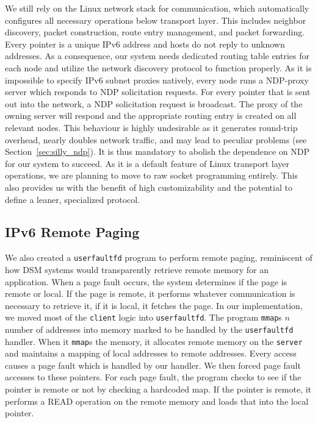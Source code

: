 We still rely on the Linux network stack for communication, which automatically configures all necessary operations below transport layer. This includes neighbor discovery, packet construction, route entry management, and packet forwarding.
Every pointer is a unique IPv6 address and hosts do not reply to unknown addresses. As a consequence, our system needs dedicated routing table entries for each node and utilize the network discovery protocol to function properly.
As it is impossible to specify IPv6 subnet proxies natively, every node runs a NDP-proxy server which responds to NDP solicitation requests. For every pointer that is sent out into the network, a NDP solicitation request is broadcast. The proxy of the owning server will respond and the appropriate routing entry is created on all relevant nodes.
This behaviour is highly undesirable as it generates round-trip overhead, nearly doubles network traffic, and may lead to peculiar problems (see Section~\ref{sec:silly_ndp}). It is thus mandatory to abolish the dependence on NDP for our system to succeed. As it is a default feature of Linux transport layer operations, we are planning to move to raw socket programming entirely. This also provides us with the benefit of high customizability and the potential to define a leaner, specialized protocol.

\subsection{IPv6 Remote Paging}
We also created a \texttt{userfaultfd} program to perform remote paging, reminiscent of how DSM systems would transparently retrieve remote memory for an application. When a page fault occurs, the system determines if the page is remote or local. If the page is remote, it performs whatever communication is necessary to retrieve it, if it is local, it fetches the page. \cite{Protic1996} In our implementation, we moved most of the \texttt{client} logic into \texttt{userfaultfd}. The program \texttt{mmap}s $n$ number of addresses into memory marked to be handled by the \texttt{userfaultfd} handler. When it \texttt{mmap}s the memory, it allocates remote memory on the \texttt{server} and maintains a mapping of local addresses to remote addresses. Every access causes a page fault which is handled by our handler. We then forced page fault accesses to these pointers. For each page fault, the program checks to see if the pointer is remote or not by checking a hardcoded map. If the pointer is remote, it performs a READ operation on the remote memory and loads that into the local pointer.

